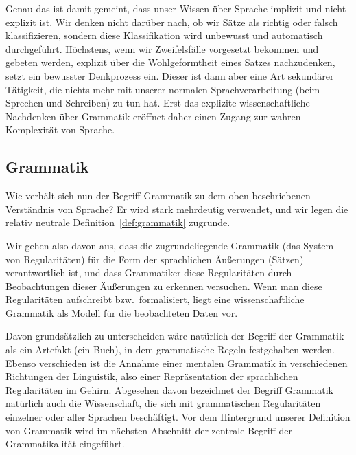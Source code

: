 Genau das ist damit gemeint, dass unser Wissen über Sprache implizit und nicht explizit ist.
Wir denken nicht darüber nach, ob wir Sätze als richtig oder falsch klassifizieren, sondern diese Klassifikation wird unbewusst und automatisch durchgeführt.
Höchstens, wenn wir Zweifelsfälle vorgesetzt bekommen und gebeten werden, explizit über die Wohlgeformtheit eines Satzes nachzudenken, setzt ein bewusster Denkprozess ein.
Dieser ist dann aber eine Art sekundärer Tätigkeit, die nichts mehr mit unserer normalen Sprachverarbeitung (beim Sprechen und Schreiben) zu tun hat.
Erst das explizite wissenschaftliche Nachdenken über Grammatik eröffnet daher einen Zugang zur wahren Komplexität von Sprache.

\subsection{Grammatik}

Wie verhält sich nun der Begriff Grammatik zu dem oben beschriebenen Verständnis von Sprache?
Er wird stark mehrdeutig verwendet, und wir legen die relativ neutrale Definition~\ref{def:grammatik} zugrunde.


Wir gehen also davon aus, dass die zugrundeliegende Grammatik (das System von Regularitäten) für die Form der sprachlichen Äußerungen (\zB Sätzen) verantwortlich ist, und dass Grammatiker diese Regularitäten durch Beobachtungen dieser Äußerungen zu erkennen versuchen.
Wenn man diese Regularitäten aufschreibt bzw.\ formalisiert, liegt eine wissenschaftliche Grammatik als Modell für die beobachteten Daten vor.

Davon grundsätzlich zu unterscheiden wäre natürlich der Begriff der Grammatik als ein Artefakt (\zB ein Buch), in dem grammatische Regeln festgehalten werden.
Ebenso verschieden ist die Annahme einer mentalen Grammatik in verschiedenen Richtungen der Linguistik, also einer Repräsentation der sprachlichen Regularitäten im Gehirn.
Abgesehen davon bezeichnet der Begriff Grammatik natürlich auch die Wissenschaft, die sich mit grammatischen Regularitäten einzelner oder aller Sprachen beschäftigt.
Vor dem Hintergrund unserer Definition von Grammatik wird im nächsten Abschnitt der zentrale Begriff der Grammatikalität eingeführt.

